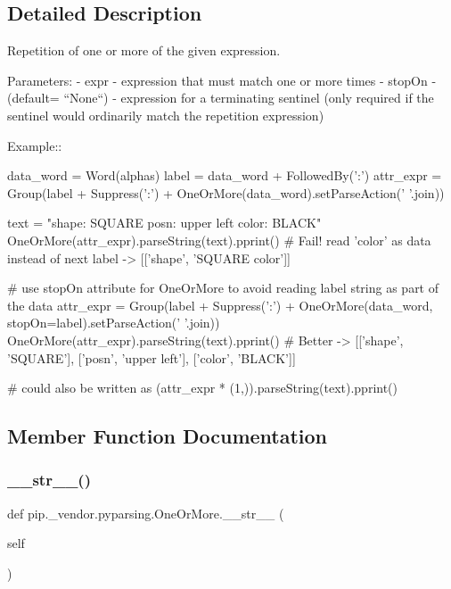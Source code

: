 \subsection{Detailed Description}
\begin{DoxyVerb}Repetition of one or more of the given expression.

Parameters:
 - expr - expression that must match one or more times
 - stopOn - (default= ``None``) - expression for a terminating sentinel
      (only required if the sentinel would ordinarily match the repetition
      expression)

Example::

    data_word = Word(alphas)
    label = data_word + FollowedBy(':')
    attr_expr = Group(label + Suppress(':') + OneOrMore(data_word).setParseAction(' '.join))

    text = "shape: SQUARE posn: upper left color: BLACK"
    OneOrMore(attr_expr).parseString(text).pprint()  # Fail! read 'color' as data instead of next label -> [['shape', 'SQUARE color']]

    # use stopOn attribute for OneOrMore to avoid reading label string as part of the data
    attr_expr = Group(label + Suppress(':') + OneOrMore(data_word, stopOn=label).setParseAction(' '.join))
    OneOrMore(attr_expr).parseString(text).pprint() # Better -> [['shape', 'SQUARE'], ['posn', 'upper left'], ['color', 'BLACK']]

    # could also be written as
    (attr_expr * (1,)).parseString(text).pprint()
\end{DoxyVerb}
 

\subsection{Member Function Documentation}
\mbox{\label{classpip_1_1__vendor_1_1pyparsing_1_1OneOrMore_a05a6d077598f5d88ac4b7d3dd1330f9f}} 
\subsubsection{\texorpdfstring{\+\_\+\+\_\+str\+\_\+\+\_\+()}{\_\_str\_\_()}}
{\footnotesize\ttfamily def pip.\+\_\+vendor.\+pyparsing.\+One\+Or\+More.\+\_\+\+\_\+str\+\_\+\+\_\+ (\begin{DoxyParamCaption}\item[{}]{self }\end{DoxyParamCaption})}



